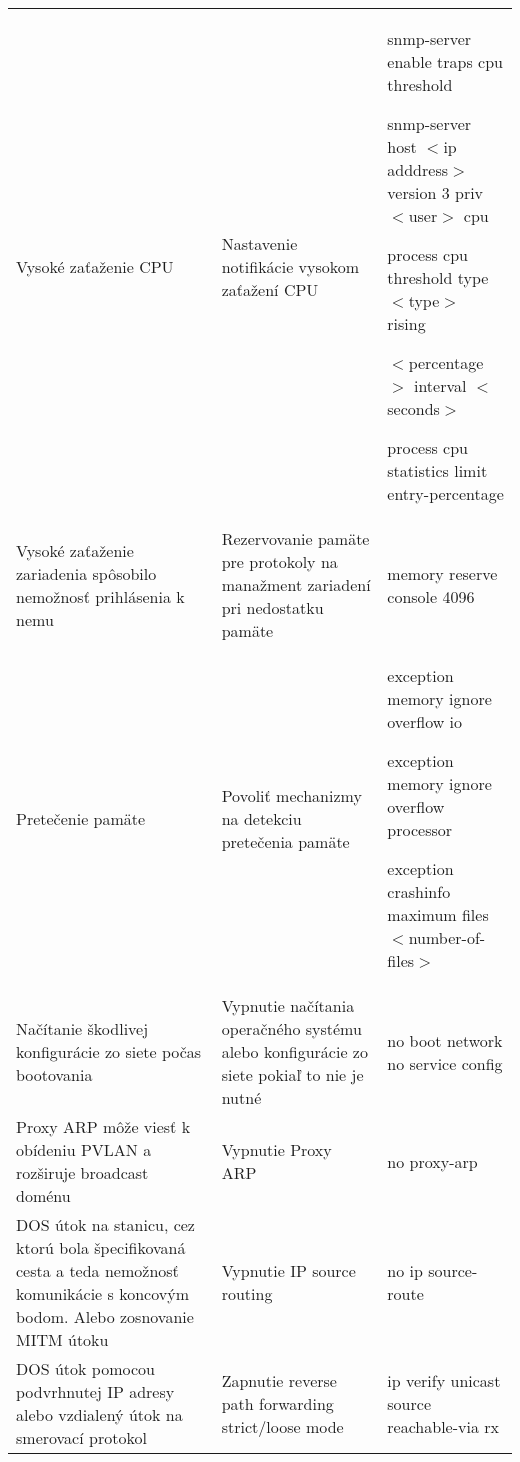 \begin{longtable}[!htbp]{|L{10em}L{10em}>{\selectfont}L{34em}|}
	
	
	
	Vysoké zaťaženie CPU	&Nastavenie notifikácie vysokom zaťažení CPU	&snmp-server enable traps cpu threshold
	
	snmp-server host $<$ip adddress$>$ version 3 priv $<$user$>$ cpu
	
	process cpu threshold type $<$type$>$ rising 
	
	\hspace{0.5em}$<$percentage$>$ interval $<$seconds$>$
	
	process cpu statistics limit entry-percentage\\
	
	
	
	 Vysoké zaťaženie zariadenia spôsobilo nemožnosť prihlásenia k nemu	&Rezervovanie pamäte pre protokoly na manažment zariadení pri nedostatku pamäte	&memory reserve console 4096\\
	
	
	
	Pretečenie pamäte	&Povoliť mechanizmy na detekciu pretečenia pamäte	&exception memory ignore overflow io
	
	exception memory ignore overflow processor
	
	exception crashinfo maximum files $<$number-of-files$>$\\
	
	
	
	
	Načítanie škodlivej konfigurácie zo siete počas bootovania	&Vypnutie načítania operačného systému alebo konfigurácie zo siete pokiaľ to nie je nutné	&no boot network
	no service config\\
	
	
	
	
	Proxy ARP môže viesť k obídeniu PVLAN a rozširuje broadcast doménu	&Vypnutie Proxy ARP	&no proxy-arp\\
	
	
	
	DOS útok na stanicu, cez ktorú bola špecifikovaná cesta a teda nemožnosť komunikácie s koncovým bodom. Alebo zosnovanie MITM útoku	&Vypnutie IP source routing	&no ip source-route\\
	
	
	
	
	DOS útok pomocou podvrhnutej IP adresy alebo vzdialený útok na smerovací protokol	&Zapnutie reverse path forwarding strict/loose mode	&ip verify unicast source reachable-via rx\\
	

\end{longtable}
